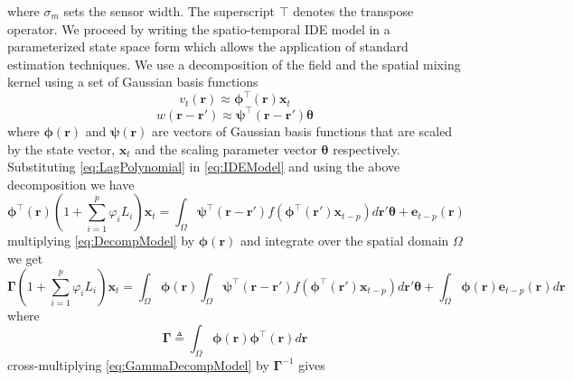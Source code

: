 \documentclass[a4paper,10pt]{article}
\begin{document}
where $\sigma_m$ sets the sensor width. The superscript $\top$ denotes the
transpose operator. We proceed by writing the spatio-temporal IDE model in a
parameterized state space form which allows the application of standard
estimation techniques. We use a decomposition of the field and the spatial
mixing kernel using a set of Gaussian basis functions
 \begin{equation}
	\label{eq:FieldDecomp} v_t\left(\mathbf{r}\right) \approx
\boldsymbol{\phi}^{\top}\left(\mathbf{r}\right) \mathbf{x}_t
\end{equation}
\begin{equation}\label{eq:KernelDecomp}
	 w\left(\mathbf{r}-\mathbf{r}'\right)
\approx\boldsymbol{\psi}^\top\left(\mathbf{r}-\mathbf{r}'\right)
\boldsymbol{\theta}
\end{equation}
where $\mathbf{\boldsymbol{\phi}}(\mathbf{r})$ and
$\mathbf{\boldsymbol{\psi}}(\mathbf{r})$ are  vectors of Gaussian basis
functions that are scaled by the state vector, $\mathbf{x}_t$ and the scaling
parameter vector $\boldsymbol\theta$ respectively. Substituting
\eqref{eq:LagPolynomial} in \eqref{eq:IDEModel} and using the above
decomposition we have
\begin{equation}\label{eq:DecompModel}
\boldsymbol{\phi}^{\top}\left(\mathbf{r}\right)(1+\sum_{i=1}^{p}\varphi_i L_i)
\mathbf{x}_t=\int_{\Omega}\boldsymbol{\psi}^\top\left(\mathbf{r}-\mathbf{r}
'\right) f(\boldsymbol{\phi}^{\top}\left(\mathbf{r'}\right)
\mathbf{x}_{t-p})d\mathbf r'\boldsymbol{\theta}+\mathbf e_{t-p}(\mathbf r)
 \end{equation}
multiplying \eqref{eq:DecompModel} by $\boldsymbol \phi(\mathbf r)$ and
integrate over the spatial domain $\Omega$ we get
\begin{equation}\label{eq:GammaDecompModel}
 \boldsymbol \Gamma (1+\sum_{i=1}^{p}\varphi_i L_i)
\mathbf{x}_t=\int_{\Omega}\boldsymbol \phi(\mathbf
r)\int_{\Omega}\boldsymbol{\psi}^\top\left(\mathbf{r}-\mathbf{r}'\right)
f(\boldsymbol{\phi}^{\top}\left(\mathbf{r'}\right) \mathbf{x}_{t-p})d\mathbf
r'\boldsymbol{\theta}+\int_{\Omega}\boldsymbol\phi(\mathbf r)\mathbf
e_{t-p}(\mathbf r)d\mathbf r
\end{equation}
where 
\begin{equation}\label{eq:DefGamma}
	\boldsymbol{\Gamma} \triangleq \int_\Omega {\boldsymbol{\phi}
\left(\mathbf{r}\right)\boldsymbol{\phi}
^{\top}\left(\mathbf{r}\right)d\mathbf{r}} 
\end{equation}
cross-multiplying \eqref{eq:GammaDecompModel} by $\boldsymbol{\Gamma}^{-1}$
gives
\end{document}
